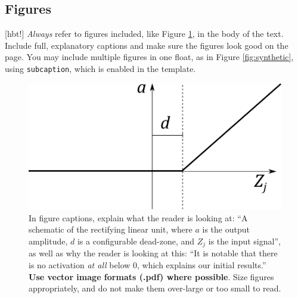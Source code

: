 \documentclass{l4proj}
\begin{document}
\subsection{Figures}[hbt!]
\emph{Always} refer to figures included, like Figure \ref{fig:relu}, in the body of the text. Include full, explanatory captions and make sure the figures look good on the page.
You may include multiple figures in one float, as in Figure \ref{fig:synthetic}, using \texttt{subcaption}, which is enabled in the template.



\begin{figure}[hbt!]
    \centering
    \includegraphics[width=0.5\linewidth]{images/relu.pdf}    

    \caption{In figure captions, explain what the reader is looking at: ``A schematic of the rectifying linear unit, where $a$ is the output amplitude,
    $d$ is a configurable dead-zone, and $Z_j$ is the input signal'', as well as why the reader is looking at this: 
    ``It is notable that there is no activation \emph{at all} below 0, which explains our initial results.'' 
    \textbf{Use vector image formats (.pdf) where possible}. Size figures appropriately, and do not make them over-large or too small to read.
    }

    \label{fig:relu} 
\end{figure}
\end{document}
